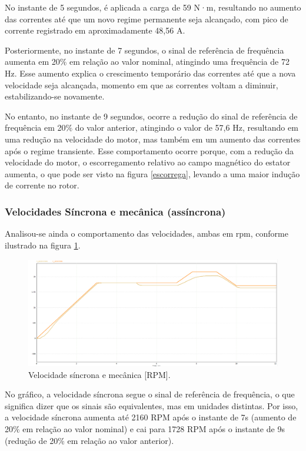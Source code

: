 \documentclass[a4paper, 11pt]{article}
\begin{document}
No instante de 5 segundos, é aplicada a carga de 59 N·m, resultando no aumento das correntes até que um novo regime permanente seja alcançado, com pico de corrente registrado em aproximadamente 48,56 A.

Posteriormente, no instante de 7 segundos, o sinal de referência de frequência aumenta em 20$\%$ em relação ao valor nominal, atingindo uma frequência de 72 Hz. Esse aumento explica o crescimento temporário das correntes até que a nova velocidade seja alcançada, momento em que as correntes voltam a diminuir, estabilizando-se novamente.

No entanto, no instante de 9 segundos, ocorre a redução do sinal de referência de frequência em 20$\%$ do valor anterior, atingindo o valor de 57,6 Hz, resultando em uma redução na velocidade do motor, mas também em um aumento das correntes após o regime transiente. Esse comportamento ocorre porque, com a redução da velocidade do motor, o escorregamento relativo ao campo magnético do estator aumenta, o que pode ser visto na figura \ref{escorrega}, levando a uma maior indução de corrente no rotor.

\subsubsection{Velocidades Síncrona e mecânica (assíncrona)}

Analisou-se ainda o comportamento das velocidades, ambas em rpm, conforme ilustrado na figura \ref{fig:velocidades}. 

\begin{figure}[H]
    \centering
    \includegraphics[width=1\linewidth]{correcao_images/corre_velocidades.png}
    \caption{Velocidade síncrona e mecânica [RPM].}
    \label{fig:velocidades}
\end{figure}

No gráfico, a velocidade síncrona segue o sinal de referência de frequência, o que significa dizer que os sinais são equivalentes, mas em unidades distintas. Por isso, a velocidade síncrona aumenta até 2160 RPM após o instante de 7s (aumento de 20$\%$ em relação ao valor nominal) e cai para 1728 RPM após o instante de 9s (redução de 20$\%$ em relação ao valor anterior).
\end{document}
